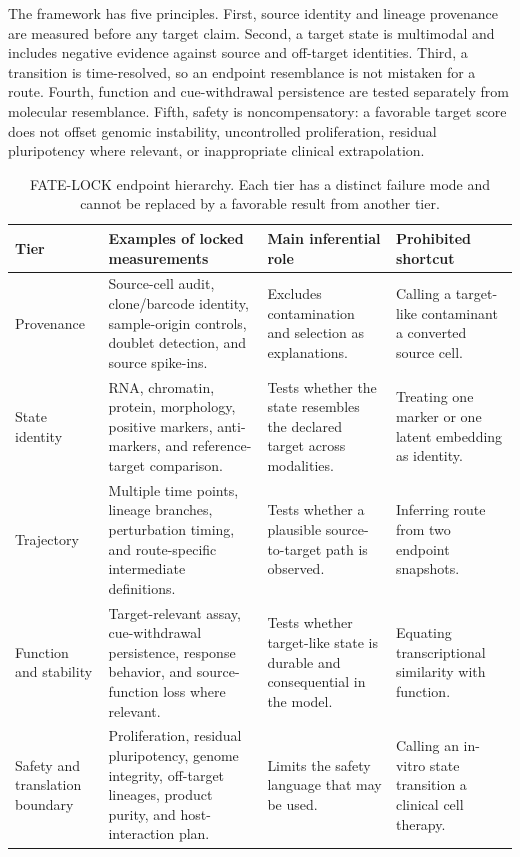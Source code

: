 \documentclass[10pt,conference]{IEEEtran}
\begin{document}
The framework has five principles. First, source identity and lineage provenance are measured before any target claim. Second, a target state is multimodal and includes negative evidence against source and off-target identities. Third, a transition is time-resolved, so an endpoint resemblance is not mistaken for a route. Fourth, function and cue-withdrawal persistence are tested separately from molecular resemblance. Fifth, safety is noncompensatory: a favorable target score does not offset genomic instability, uncontrolled proliferation, residual pluripotency where relevant, or inappropriate clinical extrapolation.

\begin{table}[!t]
\caption{FATE-LOCK endpoint hierarchy. Each tier has a distinct failure mode and cannot be replaced by a favorable result from another tier.}
\label{tab:endpoint-hierarchy}
\centering
\footnotesize
\begin{tabular}{@{}p{}p{}p{}p{}@{}}
\toprule
Tier & Examples of locked measurements & Main inferential role & Prohibited shortcut \\
\midrule
Provenance & Source-cell audit, clone/barcode identity, sample-origin controls, doublet detection, and source spike-ins. & Excludes contamination and selection as explanations. & Calling a target-like contaminant a converted source cell. \\
State identity & RNA, chromatin, protein, morphology, positive markers, anti-markers, and reference-target comparison. & Tests whether the state resembles the declared target across modalities. & Treating one marker or one latent embedding as identity. \\
Trajectory & Multiple time points, lineage branches, perturbation timing, and route-specific intermediate definitions. & Tests whether a plausible source-to-target path is observed. & Inferring route from two endpoint snapshots. \\
Function and stability & Target-relevant assay, cue-withdrawal persistence, response behavior, and source-function loss where relevant. & Tests whether target-like state is durable and consequential in the model. & Equating transcriptional similarity with function. \\
Safety and translation boundary & Proliferation, residual pluripotency, genome integrity, off-target lineages, product purity, and host-interaction plan. & Limits the safety language that may be used. & Calling an in-vitro state transition a clinical cell therapy. \\
\bottomrule
\end{tabular}
\end{table}
\end{document}
